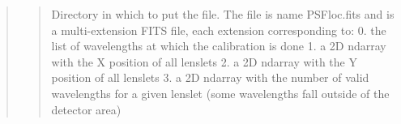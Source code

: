 \documentclass[letterpaper,10pt,english]{sphinxmanual}
\begin{document}
\begin{fulllineitems}
\begin{fulllineitems}
\begin{quote}
\begin{description}
\begin{quote}
Directory in which to put the file. The file is name PSFloc.fits and is a
multi-extension FITS file, each extension corresponding to:
0. the list of wavelengths at which the calibration is done
1. a 2D ndarray with the X position of all lenslets
2. a 2D ndarray with the Y position of all lenslets
3. a 2D ndarray with the number of valid wavelengths for a given lenslet (some wavelengths fall outside of the detector area)
\end{quote}

\end{description}\end{quote}

\end{fulllineitems}


\end{fulllineitems}

\end{document}
